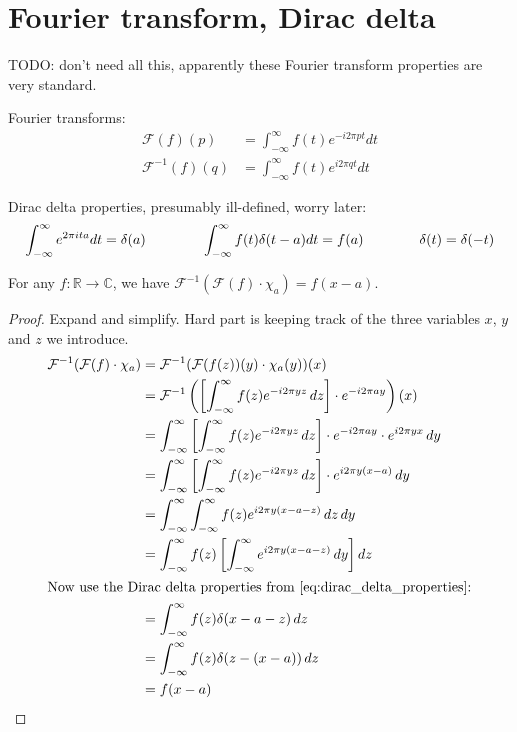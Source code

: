 \section{Fourier transform, Dirac delta}

TODO: don't need all this, apparently these Fourier transform properties are very standard.

Fourier transforms:
\begin{equation}\label{eq:fourier_transforms_defn}
\begin{aligned}
    \mathcal{F}(f)(p) &= \int_{-\infty}^{\infty} f(t) e^{-i 2 \pi p t} d t \\[5pt]
    \mathcal{F}^{-1}(f)(q) &= \int_{-\infty}^{\infty} f(t) e^{i 2 \pi q t} d t
\end{aligned}
\end{equation}

Dirac delta properties, presumably ill-defined, worry later:
\begin{equation}\label{eq:dirac_delta_properties}
\int_{-\infty}^{\infty} e^{2 \pi i t a} dt = \delta(a)
\quad\quad\qquad
\int_{-\infty}^{\infty} f(t) \delta(t-a) dt = f(a)
\quad\quad\qquad
\delta(t) = \delta(-t)
\end{equation}

\begin{lemma}
    For any $f: \mathbb{R} \to \mathbb{C}$, we have $\mathcal{F}^{-1}(\mathcal{F}(f) \cdot \chi_a) = f(x - a)$.
    \begin{proof}
        Expand and simplify.
        Hard part is keeping track of the three variables $x$, $y$ and $z$ we introduce.
        \begin{align*}
            \mathcal{F}^{-1}(\mathcal{F}(f) \cdot \chi_a)
            &= \mathcal{F}^{-1}(\mathcal{F}(f(z))(y) \cdot \chi_a(y))(x) \\
            &= \mathcal{F}^{-1}\left(\left[\int_{-\infty}^{\infty} f(z) e^{-i2\pi yz} \, dz\right] \cdot e^{-i2\pi ay}\right)(x) \\
            &= \int_{-\infty}^{\infty} \left[\int_{-\infty}^{\infty} f(z) e^{-i2\pi yz} \, dz\right] \cdot e^{-i2\pi ay} \cdot e^{i2\pi yx} \, dy \\
            &= \int_{-\infty}^{\infty} \left[\int_{-\infty}^{\infty} f(z) e^{-i2\pi yz} \, dz\right] \cdot e^{i2\pi y(x-a)} \, dy \\
            &= \int_{-\infty}^{\infty} \int_{-\infty}^{\infty} f(z) e^{i2\pi y(x-a-z)} \, dz\, dy \\
            &= \int_{-\infty}^{\infty} f(z) \left[\int_{-\infty}^{\infty} e^{i2\pi y(x-a-z)} \, dy\right] dz \\
            \intertext{Now use the Dirac delta properties from \Cref{eq:dirac_delta_properties}:}
            &= \int_{-\infty}^{\infty} f(z) \delta(x-a-z) \, dz \\
            &= \int_{-\infty}^{\infty} f(z) \delta(z - (x-a)) \, dz \\
            &= f(x-a)
        \end{align*}
    \end{proof}
\end{lemma}


